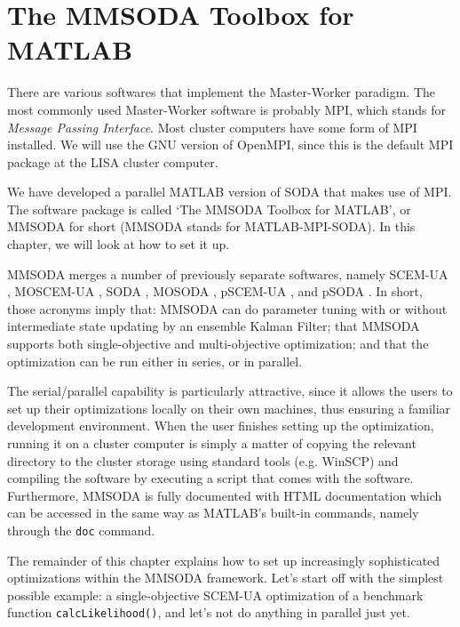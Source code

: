 \chapter{The MMSODA Toolbox for MATLAB}

There are various softwares that implement the Master-Worker paradigm. The most commonly used Master-Worker software is probably MPI, which stands for \textit{Message Passing Interface}. Most cluster computers have some form of MPI installed. We will use the GNU version of OpenMPI, since this is the default MPI package at the LISA cluster computer.

We have developed a parallel MATLAB version of SODA \citep[e.g.][]{vrug-diks-gupt-bout-vers-2005} that makes use of MPI. The software package is called `The MMSODA Toolbox for MATLAB', or MMSODA for short (MMSODA stands for MATLAB-MPI-SODA). In this chapter, we will look at how to set it up.

MMSODA merges a number of previously separate softwares, namely SCEM-UA \citep{vrug-gupt-bout-soro-2003}, MOSCEM-UA \citep{vrug-gupt-bast-bout-soro-2003}, SODA \citep{vrug-diks-gupt-bout-vers-2005}, MOSODA \citep{}, pSCEM-UA \citep{}, and pSODA \citep{}. In short, those acronyms imply that: MMSODA can do parameter tuning with or without intermediate state updating by an ensemble Kalman Filter; that MMSODA supports both single-objective and multi-objective optimization; and that the optimization can be run either in series, or in parallel.

The serial/parallel capability is particularly attractive, since it allows the users to set up their optimizations locally on their own machines, thus ensuring a familiar development environment. When the user finishes setting up the optimization, running it on a cluster computer is simply a matter of copying the relevant directory to the cluster storage using standard tools (e.g. WinSCP) and compiling the software by executing a script that comes with the software. Furthermore, MMSODA is fully documented with HTML documentation which can be accessed in the same way as MATLAB's built-in commands, namely through the \texttt{doc} command.



The remainder of this chapter explains how to set up increasingly sophisticated optimizations within the MMSODA framework. Let's start off with the simplest possible example: a single-objective SCEM-UA optimization of a benchmark function \texttt{calcLikelihood()}, and let's not do anything in parallel just yet.

